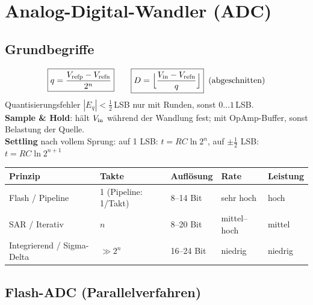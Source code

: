 \section{Analog-Digital-Wandler (ADC)}\label{sec:adc}

\subsection{Grundbegriffe}\label{sec:adc-grund}

$$ \boxed{ q = \frac{V_{\rm refp}-V_{\rm refn}}{2^n} } \qquad
   \boxed{ D = \Big\lfloor \frac{V_{\rm in}-V_{\rm refn}}{q} \Big\rfloor } \;\;\text{(abgeschnitten)} $$
Quantisierungsfehler $|E_q| < \frac12\,$LSB nur mit Runden, sonst $0\dots 1\,$LSB. \\[2pt]

\textbf{Sample \& Hold}: hält $V_{\rm in}$ während der Wandlung fest; mit OpAmp-Buffer, sonst Belastung der Quelle. \\[2pt]
\textbf{Settling} nach vollem Sprung: \; auf 1 LSB: $t = RC\ln 2^n$, \; auf $\pm\frac12$ LSB: $t = RC\ln 2^{n+1}$

\vspace{3pt}
{\renewcommand{\arraystretch}{1.45}
\begin{tabularx}{\columnwidth}{@{}l X l l l@{}}
	\toprule
	\textbf{Prinzip}           & \textbf{Takte}                     & \textbf{Auflösung} & \textbf{Rate} & \textbf{Leistung} \\ \midrule
	Flash / Pipeline           & 1 (Pipeline: 1/Takt)               & 8--14 Bit         & sehr hoch     & hoch \\
	SAR / Iterativ             & $n$                                & 8--20 Bit          & mittel--hoch  & mittel \\
	Integrierend / Sigma-Delta & $\gg 2^n$                          & 16--24 Bit         & niedrig       & niedrig \\ \bottomrule
\end{tabularx}}

\subsection{Flash-ADC (Parallelverfahren)}\label{sec:flash}

